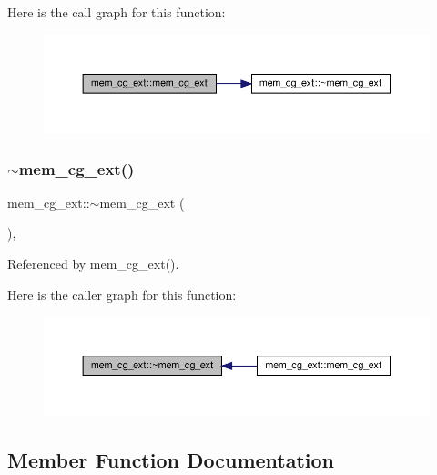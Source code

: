 Here is the call graph for this function\+:
\nopagebreak
\begin{figure}[H]
\begin{center}
\leavevmode
\includegraphics[width=350pt]{df/da8/classmem__cg__ext_ac600df8f688939e3794a3ea7dcac4151_cgraph}
\end{center}
\end{figure}
\mbox{\label{classmem__cg__ext_a719c9d69a2b61e5879acb0834ec913b6}} 
\subsubsection{\texorpdfstring{$\sim$mem\+\_\+cg\+\_\+ext()}{~mem\_cg\_ext()}}
{\footnotesize\ttfamily mem\+\_\+cg\+\_\+ext\+::$\sim$mem\+\_\+cg\+\_\+ext (\begin{DoxyParamCaption}{ }\end{DoxyParamCaption})\hspace{0.3cm}{\ttfamily [override]}, {\ttfamily [default]}}



Referenced by mem\+\_\+cg\+\_\+ext().

Here is the caller graph for this function\+:
\nopagebreak
\begin{figure}[H]
\begin{center}
\leavevmode
\includegraphics[width=350pt]{df/da8/classmem__cg__ext_a719c9d69a2b61e5879acb0834ec913b6_icgraph}
\end{center}
\end{figure}


\subsection{Member Function Documentation}
\mbox{\label{classmem__cg__ext_a86e9ef6358e3a59fe7d9e4cd7c3700ef}} 
